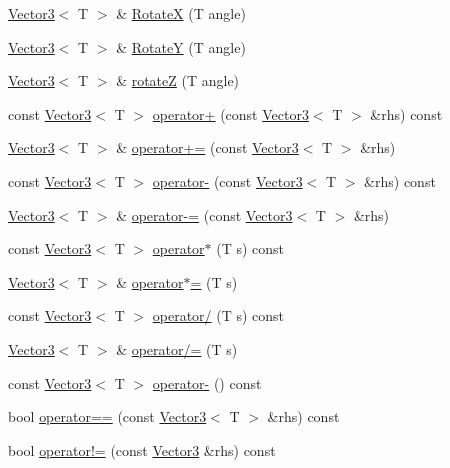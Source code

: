 \begin{DoxyCompactItemize}
\item 
\hyperlink{classastu_1_1Vector3}{Vector3}$<$ T $>$ \& \hyperlink{classastu_1_1Vector3_a94bd2e7f4cebae1c9187d8e7dcee98f5}{RotateX} (T angle)
\item 
\hyperlink{classastu_1_1Vector3}{Vector3}$<$ T $>$ \& \hyperlink{classastu_1_1Vector3_af2d98a2b2d74b6e9f0785fa6f3ace9c0}{RotateY} (T angle)
\item 
\hyperlink{classastu_1_1Vector3}{Vector3}$<$ T $>$ \& \hyperlink{classastu_1_1Vector3_a04a7b7fd1553048efef60e8aa38be1db}{rotateZ} (T angle)
\item 
const \hyperlink{classastu_1_1Vector3}{Vector3}$<$ T $>$ \hyperlink{classastu_1_1Vector3_a604044fcf4081d41647ed31952c2316c}{operator+} (const \hyperlink{classastu_1_1Vector3}{Vector3}$<$ T $>$ \&rhs) const
\item 
\hyperlink{classastu_1_1Vector3}{Vector3}$<$ T $>$ \& \hyperlink{classastu_1_1Vector3_a613ae7519aebcd1b976b0a9fdf11a9d1}{operator+=} (const \hyperlink{classastu_1_1Vector3}{Vector3}$<$ T $>$ \&rhs)
\item 
const \hyperlink{classastu_1_1Vector3}{Vector3}$<$ T $>$ \hyperlink{classastu_1_1Vector3_ac5e9185fcbde32a799d4cf7d7a147477}{operator-\/} (const \hyperlink{classastu_1_1Vector3}{Vector3}$<$ T $>$ \&rhs) const
\item 
\hyperlink{classastu_1_1Vector3}{Vector3}$<$ T $>$ \& \hyperlink{classastu_1_1Vector3_ae1d173eae2ddeb23fe18794233bed63d}{operator-\/=} (const \hyperlink{classastu_1_1Vector3}{Vector3}$<$ T $>$ \&rhs)
\item 
const \hyperlink{classastu_1_1Vector3}{Vector3}$<$ T $>$ \hyperlink{classastu_1_1Vector3_a3a9a71ee7a4cae2fdec116f6a937e0a4}{operator$\ast$} (T s) const
\item 
\hyperlink{classastu_1_1Vector3}{Vector3}$<$ T $>$ \& \hyperlink{classastu_1_1Vector3_ae67ab494d97f1be0cad3a638e12320f5}{operator$\ast$=} (T s)
\item 
const \hyperlink{classastu_1_1Vector3}{Vector3}$<$ T $>$ \hyperlink{classastu_1_1Vector3_a6c36c85f2345591b119f7697d2382fbc}{operator/} (T s) const
\item 
\hyperlink{classastu_1_1Vector3}{Vector3}$<$ T $>$ \& \hyperlink{classastu_1_1Vector3_a858693a6f564e9d359db60f04d497d28}{operator/=} (T s)
\item 
const \hyperlink{classastu_1_1Vector3}{Vector3}$<$ T $>$ \hyperlink{classastu_1_1Vector3_aae482f77db8c14915f9757f73bcd45d0}{operator-\/} () const
\item 
bool \hyperlink{classastu_1_1Vector3_ae6ce2eeed8a3396664797ee680fda88a}{operator==} (const \hyperlink{classastu_1_1Vector3}{Vector3}$<$ T $>$ \&rhs) const
\item 
bool \hyperlink{classastu_1_1Vector3_acfa026172a7baefb2096e6489499d0d8}{operator!=} (const \hyperlink{classastu_1_1Vector3}{Vector3} \&rhs) const
\end{DoxyCompactItemize}
